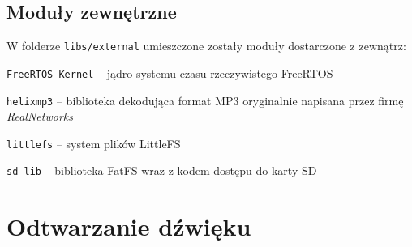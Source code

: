 \documentclass[polish]{aghengthesis}
\let\tempone\itemize
\let\temptwo\enditemize
\renewenvironment{itemize}{\tempone\setlength{\itemsep}{0cm}}{\temptwo}
\begin{document}
		\subsection{Moduły zewnętrzne}
		W folderze \lstinline|libs/external| umieszczone zostały moduły dostarczone z zewnątrz:
		\begin{itemize}
			\item \lstinline|FreeRTOS-Kernel| -- jądro systemu czasu rzeczywistego FreeRTOS\textsuperscript{\cite{freertos_kernel}}
			\item \lstinline|helixmp3| -- biblioteka dekodująca format MP3\textsuperscript{\cite{helixmp3_repo}} oryginalnie napisana przez firmę \textit{RealNetworks}\textsuperscript{\cite{realnetworks}}
			\item \lstinline|littlefs| -- system plików LittleFS\textsuperscript{\cite{littlefs}}
			\item \lstinline|sd_lib| -- biblioteka FatFS\textsuperscript{\cite{fatfs}} wraz z kodem dostępu do karty SD\textsuperscript{\cite{sdfs}}
		\end{itemize}

	\section{Odtwarzanie dźwięku}
%		
%		
%		
		
\end{document}
